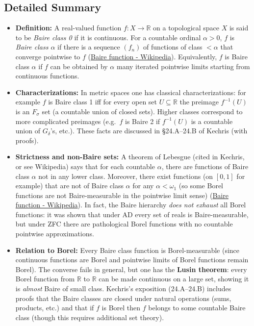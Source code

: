 \documentclass[11pt]{article}
\begin{document}
\subsection{Detailed Summary}
\label{detailed-summary-7}
\begin{itemize}
\item \textbf{Definition:} A real-valued function \(f:X\to\mathbb{R}\) on a
topological space \(X\) is said to be \emph{Baire class 0} if it is
continuous. For a countable ordinal \(\alpha>0\), \(f\) is \emph{Baire
class \(\alpha\)} if there is a sequence \((f_n)\) of functions of
class \(<\alpha\) that converge pointwise to \(f\)
(\href{https://en.wikipedia.org/wiki/Baire\_function\#:\~:text=,Baire\%20class\%20less\%20than\%20\%CE\%B1}{Baire
function - Wikipedia}). Equivalently, \(f\) is Baire class \(\alpha\)
if \(f\) can be obtained by \(\alpha\) many iterated pointwise limits
starting from continuous functions.

\item \textbf{Characterizations:} In metric spaces one has classical
characterizations: for example \(f\) is Baire class 1 iff for every
open set \(U\subseteq\mathbb{R}\) the preimage \(f^{-1}(U)\) is an
\(F_\sigma\) set (a countable union of closed sets). Higher classes
correspond to more complicated preimages (e.g. \(f\) is Baire 2 if
\(f^{-1}(U)\) is a countable union of \(G_\delta\)'s, etc.). These
facts are discussed in §24.A--24.B of Kechris (with proofs).

\item \textbf{Strictness and non-Baire sets:} A theorem of Lebesgue (cited in
Kechris, or see Wikipedia) says that for each countable \(\alpha\),
there are functions of Baire class \(\alpha\) not in any lower class.
Moreover, there exist functions (on \([0,1]\) for example) that are
not of Baire class \(\alpha\) for any \(\alpha<\omega_1\) (so some
Borel functions are not Baire-measurable in the pointwise limit sense)
(\href{https://en.wikipedia.org/wiki/Baire\_function\#:\~:text=Baire\%20class\%20of\%20a\%20countable,not\%20in\%20any\%20Baire\%20class}{Baire
function - Wikipedia}). In fact, the Baire hierarchy \emph{does not
exhaust} all Borel functions: it was shown that under AD every set of
reals is Baire-measurable, but under ZFC there are pathological Borel
functions with no countable pointwise approximations.

\item \textbf{Relation to Borel:} Every Baire class function is Borel-measurable
(since continuous functions are Borel and pointwise limits of Borel
functions remain Borel). The converse fails in general, but one has
the \textbf{Lusin theorem}: every Borel function from \(\mathbb{R}\) to
\(\mathbb{R}\) can be made continuous on a large set, showing it is
\emph{almost} Baire of small class. Kechris's exposition (24.A--24.B)
includes proofs that the Baire classes are closed under natural
operations (sums, products, etc.) and that if \(f\) is Borel then
\(f\) belongs to some countable Baire class (though this requires
additional set theory).


\end{itemize}
\end{document}
